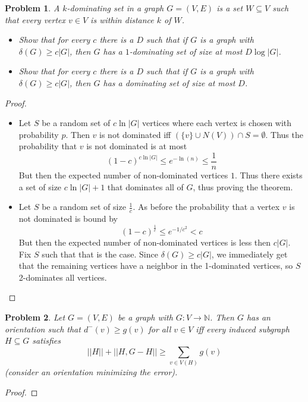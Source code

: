 \documentclass[12pt]{article}
\newtheorem{problem}{Problem}
\begin{document}
\begin{problem} A $k$-dominating set in a graph $G=(V,E)$ is a set
  $W \subseteq V$ such that every vertex $v \in V$ is within distance
  $k$ of $W$.
  \begin{itemize}
  \item[(a)] Show that for every $c$ there is a $D$ such that if $G$
    is a graph with $\delta(G) \geq c|G|$, then $G$ has a
    $1$-dominating set of size at most $D \log |G|$.
  \item[(b)] Show that for every $c$ there is a $D$ such that if $G$
    is a graph with $\delta(G) \geq c|G|$, then $G$ has a dominating
    set of size at most $D$.
  \end{itemize}
\end{problem}
\begin{proof}
  \begin{itemize}
  \item[(a)] Let $S$ be a random set of $c \ln |G|$ vertices where
    each vertex is chosen with probability $p$. Then $v$ is not
    dominated iff $(\{v\} \cup N(V)) \cap S = \emptyset$. Thus the
    probability that $v$ is not dominated is at most
    \[
      {(1 - c)}^{c \ln |G|} \leq e^{-\ln(n)} \leq \dfrac{1}{n}
    \]
    But then the expected number of non-dominated vertices $1$. Thus
    there exists a set of size $c \ln |G| + 1$ that dominates all of
    $G$, thus proving the theorem.
  \item[(b)] Let $S$ be a random set of size $\frac{1}{c}$. As before
    the probability that a vertex $v$ is not dominated is bound by
    \[
      {(1 - c)}^{\frac{1}{c}} \leq e^{- 1/ c^2} < c
    \]
    But then the expected number of non-dominated vertices is less
    then $c |G|$. Fix $S$ such that that is the case. Since
    $\delta(G) \geq c|G|$, we immediately get that the remaining
    vertices have a neighbor in the 1-dominated vertices, so $S$
    2-dominates all vertices.
  \end{itemize}
\end{proof}

\begin{problem} Let $G=(V,E)$ be a graph with $G: V \to
  \mathbb{N}$. Then $G$ has an orientation such that
  $d^-(v) \geq g(v)$ for all $v \in V$ iff every induced subgraph
  $H \subseteq G$ satisfies
  \[
    ||H|| + ||H, G-H|| \geq \sum_{v \in V(H)} g(v)
  \]
  (consider an orientation minimizing the error).
\end{problem}
\begin{proof}
\end{proof}
\end{document}
